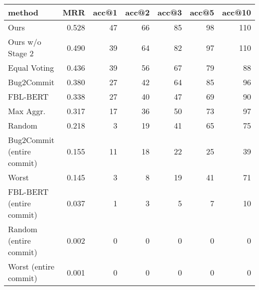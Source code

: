 \begin{tabular}{lrrrrrr}
\toprule
                    method &   MRR &  acc@1 &  acc@2 &  acc@3 &  acc@5 &  acc@10 \\
\midrule
                      Ours & 0.528 &     47 &     66 &     85 &     98 &     110 \\
          Ours w/o Stage 2 & 0.490 &     39 &     64 &     82 &     97 &     110 \\
              Equal Voting & 0.436 &     39 &     56 &     67 &     79 &      88 \\
                Bug2Commit & 0.380 &     27 &     42 &     64 &     85 &      96 \\
                  FBL-BERT & 0.338 &     27 &     40 &     47 &     69 &      90 \\
                 Max Aggr. & 0.317 &     17 &     36 &     50 &     73 &      97 \\
                    Random & 0.218 &      3 &     19 &     41 &     65 &      75 \\
Bug2Commit (entire commit) & 0.155 &     11 &     18 &     22 &     25 &      39 \\
                     Worst & 0.145 &      3 &      8 &     19 &     41 &      71 \\
  FBL-BERT (entire commit) & 0.037 &      1 &      3 &      5 &      7 &      10 \\
    Random (entire commit) & 0.002 &      0 &      0 &      0 &      0 &       0 \\
     Worst (entire commit) & 0.001 &      0 &      0 &      0 &      0 &       0 \\
\bottomrule
\end{tabular}
